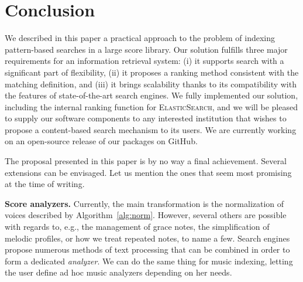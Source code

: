 \documentclass[letterpaper, 11pt]{article}
\def\neuma/{\textsc{Anonymized}}
\def\munir/{\textsc{MuNIR}}
\def\elasticsearch/{\textsc{ElasticSearch}}
\begin{document}
\section{Conclusion}\label{sec:conclusion}

We described in this paper a practical approach to the problem of indexing
pattern-based searches in a large score library. Our solution fulfills three major 
requirements for an information retrieval system: (i) it supports search with 
a significant part of flexibility, (ii) it proposes a ranking method consistent with
the matching definition, and (iii) it brings scalability thanks to its
compatibility  with the features of state-of-the-art search engines.  We fully 
implemented our solution, including the internal ranking function for \elasticsearch/,
and we will be pleased to supply our software components to any interested institution
that wishes to propose a content-based search mechanism to its users. We are currently working on 
an open-source release of our packages on GitHub.
 
The proposal presented in this paper is by no way a final achievement. Several extensions can be envisaged. Let us mention the ones that seem most promising at the time of writing.

\noindent
\textbf{Score analyzers.} Currently, the main transformation is the normalization of voices
described by Algorithm~\ref{alg:norm}. However, several others are possible with regards to, e.g.,  the
management of grace notes, the simplification of melodic profiles, or how we treat repeated notes, to
name a few. Search engines propose numerous methods of text processing that can be combined in order
to form a dedicated \emph{analyzer}. We can do the same thing for music indexing, letting the user define
ad hoc music analyzers depending on her needs.








\end{document}
